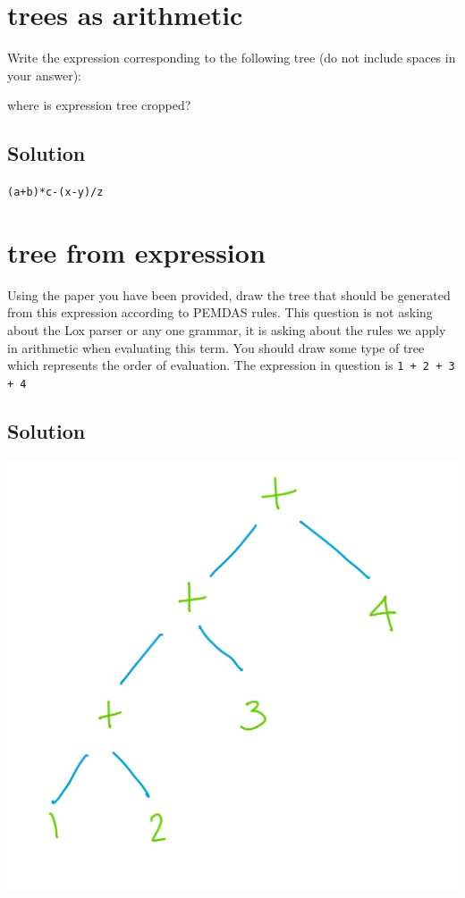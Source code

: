 \documentclass[twoside=false, DIV=14]{scrartcl}
\begin{document}
\section*{trees as arithmetic}
  Write the expression corresponding to the following tree (do not include spaces in your answer):
  \begin{todo}
  where is expression tree cropped?
  \end{todo}
\subsection*{Solution}
  \lstinline|(a+b)*c-(x-y)/z|

\section*{tree from expression}
  Using the paper you have been provided, draw the tree that should be generated from this expression according to PEMDAS rules.  This question is not asking about the Lox parser or any one grammar, it is asking about the rules we apply in arithmetic when evaluating this term.  You should draw some type of tree which represents the order of evaluation.  The expression in question is \lstinline|1 + 2 + 3 + 4|
\subsection*{Solution}
  \includegraphics[width=\textwidth]{expr_tree_five.jpeg}
\end{document}
